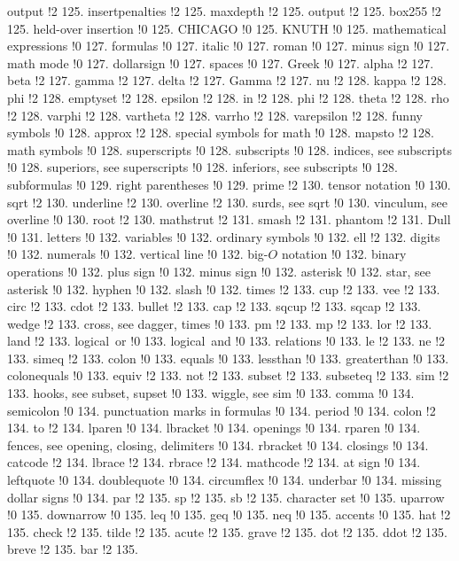 output !2 125.
insertpenalties !2 125.
maxdepth !2 125.
output !2 125.
box255 !2 125.
held-over insertion !0 125.
CHICAGO !0 125.
KNUTH !0 125.
mathematical expressions !0 127.
formulas !0 127.
italic !0 127.
roman !0 127.
minus sign !0 127.
math mode !0 127.
dollarsign !0 127.
spaces !0 127.
Greek !0 127.
alpha !2 127.
beta !2 127.
gamma !2 127.
delta !2 127.
Gamma !2 127.
nu !2 128.
kappa !2 128.
phi !2 128.
emptyset !2 128.
epsilon !2 128.
in !2 128.
phi !2 128.
theta !2 128.
rho !2 128.
varphi !2 128.
vartheta !2 128.
varrho !2 128.
varepsilon !2 128.
funny symbols !0 128.
approx !2 128.
special symbols for math !0 128.
mapsto !2 128.
math symbols !0 128.
superscripts !0 128.
subscripts !0 128.
indices, see subscripts !0 128.
superiors, see superscripts !0 128.
inferiors, see subscripts !0 128.
subformulas !0 129.
right parentheses !0 129.
prime !2 130.
tensor notation !0 130.
sqrt !2 130.
underline !2 130.
overline !2 130.
surds, see sqrt !0 130.
vinculum, see overline !0 130.
root !2 130.
mathstrut !2 131.
smash !2 131.
phantom !2 131.
Dull !0 131.
letters !0 132.
variables !0 132.
ordinary symbols !0 132.
ell !2 132.
digits !0 132.
numerals !0 132.
vertical line !0 132.
big-$O$ notation !0 132.
binary operations !0 132.
plus sign !0 132.
minus sign !0 132.
asterisk !0 132.
star, see asterisk !0 132.
hyphen !0 132.
slash !0 132.
times !2 133.
cup !2 133.
vee !2 133.
circ !2 133.
cdot !2 133.
bullet !2 133.
cap !2 133.
sqcup !2 133.
sqcap !2 133.
wedge !2 133.
cross, see dagger, times !0 133.
pm !2 133.
mp !2 133.
lor !2 133.
land !2 133.
logical\penalty \@M \ or !0 133.
logical\penalty \@M \ and !0 133.
relations !0 133.
le !2 133.
ne !2 133.
simeq !2 133.
colon !0 133.
equals !0 133.
lessthan !0 133.
greaterthan !0 133.
colonequals !0 133.
equiv !2 133.
not !2 133.
subset !2 133.
subseteq !2 133.
sim !2 133.
hooks, see subset, supset !0 133.
wiggle, see sim !0 133.
comma !0 134.
semicolon !0 134.
punctuation marks in formulas !0 134.
period !0 134.
colon !2 134.
to !2 134.
lparen !0 134.
lbracket !0 134.
openings !0 134.
rparen !0 134.
fences, see opening, closing, delimiters !0 134.
rbracket !0 134.
closings !0 134.
catcode !2 134.
lbrace !2 134.
rbrace !2 134.
mathcode !2 134.
at sign !0 134.
leftquote !0 134.
doublequote !0 134.
circumflex !0 134.
underbar !0 134.
missing dollar signs !0 134.
par !2 135.
sp !2 135.
sb !2 135.
character set !0 135.
uparrow !0 135.
downarrow !0 135.
leq !0 135.
geq !0 135.
neq !0 135.
accents !0 135.
hat !2 135.
check !2 135.
tilde !2 135.
acute !2 135.
grave !2 135.
dot !2 135.
ddot !2 135.
breve !2 135.
bar !2 135.
